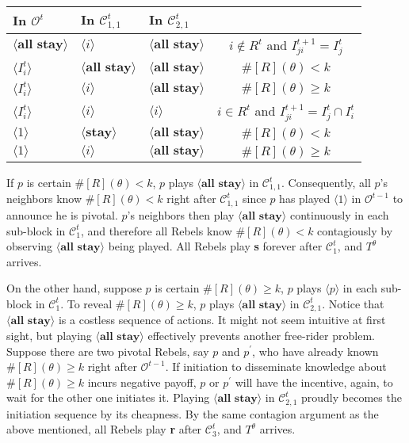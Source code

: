 \documentclass[12pt,letter]{article}
\newcommand{\Kappa}{\mathcal{C}}
\newcommand{\Omicron}{\mathcal{O}}
\theoremstyle{definition}
\theoremstyle{remark}
\theoremstyle{claim}
\begin{document}
\begin{table}[!htbp]
\begin{center}
\begin{tabular}{l l l | c}
\hline
\hline
In $\Omicron^t$			&	In $\Kappa^t_{1,1}$			&			In $\Kappa^t_{2,1}$		&   \\
\hline
$\langle \textbf{all stay} \rangle$  & $\langle i \rangle$	&  $\langle \textbf{all stay} \rangle$ &  $i\notin R^t$ and $I^{t+1}_{ji}=I^t_j$  \\
$\langle I^t_{i} \rangle$  & $\langle \textbf{all stay} \rangle$	&  $\langle \textbf{all stay} \rangle$ &  $\#[R](\theta)< k$ \\
$\langle I^t_{i} \rangle$  & $\langle i \rangle$	&  $\langle \textbf{all stay} \rangle$ &  $\#[R](\theta)\geq k$ \\
$\langle I^t_{i} \rangle$  & $\langle i \rangle$	&  $\langle i \rangle$ &  $i\in R^t$ and $I^{t+1}_{ji}=I^t_j\cap I^t_{i}$ \\
$\langle 1 \rangle$  & $\langle \textbf{stay} \rangle$	&	$\langle \textbf{all stay} \rangle$ &  $\#[R](\theta)< k$    \\
$\langle 1 \rangle$  & $\langle i \rangle$	&	$\langle \textbf{all stay} \rangle$ &  $\#[R](\theta)\geq k$  \\
  \hline
\end{tabular}
\end{center}
\end{table}






If $p$ is certain $\#[R](\theta)< k$, $p$ plays $\langle \textbf{all stay} \rangle$ in $\Kappa^{t}_{1,1}$. Consequently, all $p$'s neighbors know $\#[R](\theta)< k$ right after $\Kappa^{t}_{1,1}$ since $p$ has played $\langle 1 \rangle$ in $\Omicron^{t-1}$ to announce he is pivotal. $p$'s neighbors then play $\langle \textbf{all stay} \rangle$ continuously in each sub-block in $\Kappa^{t}_{1}$, and therefore all Rebels know $\#[R](\theta)< k$ contagiously by observing $\langle \textbf{all stay} \rangle$ being played. All Rebels play \textbf{s} forever after $\Kappa^{t}_{1}$, and $T^{\theta}$ arrives. 

On the other hand, suppose $p$ is certain $\#[R](\theta)\geq k$, $p$ plays $\langle p \rangle$ in each sub-block in $\Kappa^{t}_{1}$. To reveal $\#[R](\theta)\geq k$, $p$ plays $\langle \textbf{all stay} \rangle$ in $\Kappa^{t}_{2,1}$. Notice that $\langle \textbf{all stay} \rangle$ is a costless sequence of actions. It might not seem intuitive at first sight, but playing $\langle \textbf{all stay} \rangle$ effectively prevents another free-rider problem. Suppose there are two pivotal Rebels, say $p$ and $p^{'}$, who have already known $\#[R](\theta)\geq k$ right after $\Omicron^{t-1}$. If initiation to disseminate knowledge about $\#[R](\theta)\geq k$ incurs negative payoff, $p$ or $p^{'}$ will have the incentive, again, to wait for the other one initiates it. Playing $\langle \textbf{all stay} \rangle$ in $\Kappa^t_{2,1}$ proudly becomes the initiation sequence by its cheapness. By the same contagion argument as the above mentioned, all Rebels play \textbf{r} after $\Kappa^t_{3}$, and $T^{\theta}$ arrives.
\end{document}
